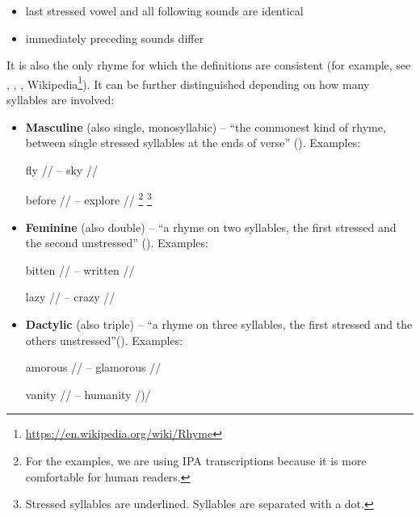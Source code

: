 \begin{itemize}
	\item last stressed vowel and all following sounds are identical
	\item immediately preceding sounds differ
\end{itemize}

It is also the only rhyme for which the definitions are consistent (for example, see \cite{bain1867manual}, \cite{vanphonological}, \cite{bergman2017litcharts}, Wikipedia\footnote{\url{https://en.wikipedia.org/wiki/Rhyme} }).
It can be further distinguished depending on how many syllables are involved:

\begin{itemize}
	\item \textbf{Masculine} (also single, monosyllabic) -- ``the commonest kind of rhyme, between single stressed syllables at the ends of verse'' (\cite{oxforddict2008literary}). 
	Examples: 
	
	fly // -- sky //
	
	before // -- explore //
	\footnote{For the examples, we are using IPA transcriptions because it is more comfortable for human readers. }
	\footnote{Stressed syllables are underlined. Syllables are separated with a dot.}
	
	\item \textbf{Feminine} (also double) -- ``a rhyme on two syllables, the first stressed and the second unstressed'' (\cite{oxforddict2008literary}). Examples: 
	
	bitten // -- written //
	
	lazy // -- crazy //
	
	\item \textbf{Dactylic} (also triple) -- ``a rhyme on three syllables, the first stressed and the others unstressed''(\cite{oxforddict2008literary}). Examples: 
	
	amorous // -- glamorous //
	
	vanity // -- humanity /)/
	
\end{itemize}

